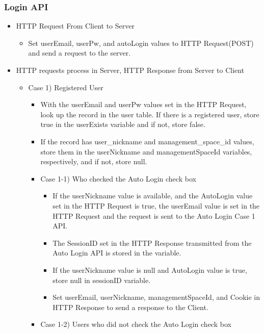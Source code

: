 \documentclass[conference]{IEEEtran}
\begin{document}
\subsubsection{Login API}
\begin{itemize}
    \item HTTP Request From Client to Server
    \begin{itemize}
        \item Set userEmail, userPw, and autoLogin values to HTTP Request(POST) and send a request to the server.
        \\
    \end{itemize}
    \item HTTP requests process in Server, HTTP Response from Server to Client
    \begin{itemize}
        \item Case 1) Registered User
        \begin{itemize}
            \item With the userEmail and userPw values set in the HTTP Request, look up the record in the user table. If there is a registered user, store true in the userExists variable and if not, store false.
            \item If the record has user\_nickname and management\_space\_id values, store them in the userNickname and managementSpaceId variables, respectively, and if not, store null.
            \item Case 1-1) Who checked the Auto Login check box
            \begin{itemize}
                \item If the userNickname value is available, and the AutoLogin value set in the HTTP Request is true, the userEmail value is set in the HTTP Request and the request is sent to the Auto Login Case 1 API.
                \item The SessionID set in the HTTP Response transmitted from the Auto Login API is stored in the variable.
                \item If the userNickname value is null and AutoLogin value is true, store null in sessionID variable.
                \item Set userEmail, userNickname, managementSpaceId, and Cookie in HTTP Response to send a response to the Client.
            \end{itemize}
            \item Case 1-2) Users who did not check the Auto Login check box
            \begin{itemize}

\end{itemize}
\end{itemize}
\end{itemize}
\end{itemize}
\end{document}
